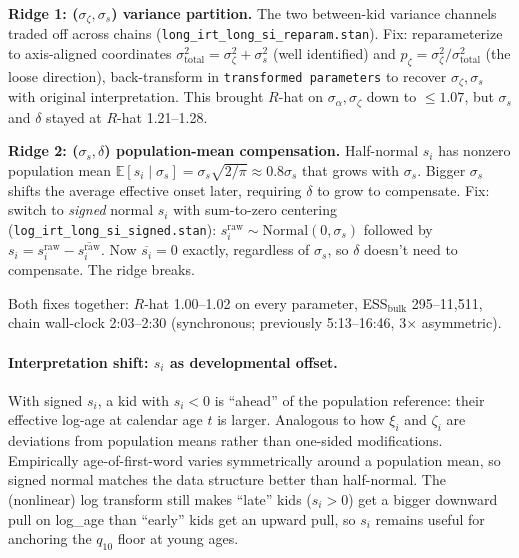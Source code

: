 \documentclass[11pt]{article}
\begin{document}
\textbf{Ridge 1: (\(\sigma_\zeta, \sigma_s\)) variance partition.}
The two between-kid variance channels traded off across chains
(\texttt{long\_irt\_long\_si\_reparam.stan}). Fix: reparameterize to
axis-aligned coordinates
\(\sigma_{\text{total}}^2 = \sigma_\zeta^2 + \sigma_s^2\) (well
identified) and \(p_\zeta = \sigma_\zeta^2 / \sigma_{\text{total}}^2\)
(the loose direction), back-transform in \texttt{transformed
parameters} to recover \(\sigma_\zeta, \sigma_s\) with original
interpretation. This brought \(R\)-hat on \(\sigma_\alpha, \sigma_\zeta\)
down to \(\le 1.07\), but \(\sigma_s\) and \(\delta\) stayed at
\(R\)-hat 1.21--1.28.

\textbf{Ridge 2: (\(\sigma_s, \delta\)) population-mean compensation.}
Half-normal \(s_i\) has nonzero population mean
\(\mathbb{E}[s_i \mid \sigma_s] = \sigma_s\sqrt{2/\pi} \approx 0.8\sigma_s\)
that grows with \(\sigma_s\). Bigger \(\sigma_s\) shifts the average
effective onset later, requiring \(\delta\) to grow to compensate.
Fix: switch to \emph{signed} normal \(s_i\) with sum-to-zero centering
(\texttt{log\_irt\_long\_si\_signed.stan}):
\(s_i^{\text{raw}} \sim \mathrm{Normal}(0, \sigma_s)\) followed by
\(s_i = s_i^{\text{raw}} - \overline{s_i^{\text{raw}}}\). Now
\(\overline{s_i} = 0\) exactly, regardless of \(\sigma_s\), so
\(\delta\) doesn't need to compensate. The ridge breaks.

Both fixes together: \(R\)-hat 1.00--1.02 on every parameter,
ESS\(_{\text{bulk}}\) 295--11{,}511, chain wall-clock 2:03--2:30
(synchronous; previously 5:13--16:46, 3\(\times\) asymmetric).

\paragraph{Interpretation shift: \(s_i\) as developmental offset.}
With signed \(s_i\), a kid with \(s_i < 0\) is ``ahead'' of the
population reference: their effective log-age at calendar age \(t\)
is larger. Analogous to how \(\xi_i\) and \(\zeta_i\) are deviations
from population means rather than one-sided modifications.
Empirically age-of-first-word varies symmetrically around a population
mean, so signed normal matches the data structure better than
half-normal. The (nonlinear) log transform still makes ``late'' kids
(\(s_i > 0\)) get a bigger downward pull on log\_age than ``early''
kids get an upward pull, so \(s_i\) remains useful for anchoring the
\(q_{10}\) floor at young ages.
\end{document}

